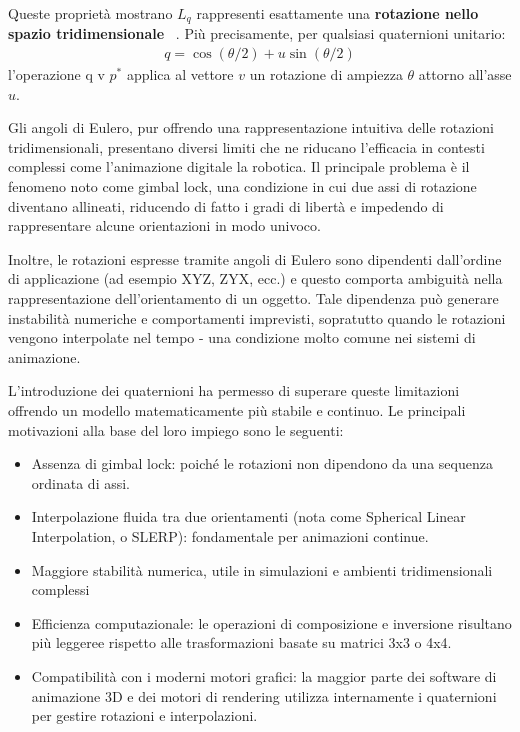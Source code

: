 \begin{itemize}
    Queste proprietà mostrano ${L_q}$ rappresenti esattamente una \textbf{rotazione nello spazio tridimensionale} ~\cite{quater3}.
    Più precisamente, per qualsiasi quaternioni unitario:
    \begin{align*}
        q = {\cos{(\theta/2)} + u\sin{(\theta/2)}}
    \end{align*}
    l'operazione q v ${p^*}$ applica al vettore ${v}$ un rotazione di ampiezza ${\theta}$ attorno all'asse ${u}$.

    Gli angoli di Eulero, pur offrendo una rappresentazione intuitiva delle rotazioni tridimensionali, presentano diversi limiti che ne riducano l'efficacia in contesti complessi come l'animazione digitale  la robotica. Il principale problema è il fenomeno noto come gimbal lock, una condizione in cui due assi di rotazione diventano allineati, riducendo di fatto i gradi di libertà e impedendo di rappresentare alcune orientazioni in modo univoco.

    Inoltre, le rotazioni espresse tramite angoli di Eulero sono dipendenti dall'ordine di applicazione (ad esempio XYZ, ZYX, ecc.) e questo comporta ambiguità nella rappresentazione dell'orientamento di un oggetto. Tale dipendenza può generare instabilità numeriche e comportamenti imprevisti, sopratutto quando le rotazioni vengono interpolate nel tempo - una condizione molto comune nei sistemi di animazione.

    L'introduzione dei quaternioni ha permesso di superare queste limitazioni offrendo un modello matematicamente più stabile e continuo. Le principali motivazioni alla base del loro impiego sono le seguenti:

    \begin{itemize}
        \item Assenza di gimbal lock: poiché le rotazioni non dipendono da una sequenza ordinata di assi.
        \item Interpolazione fluida tra due orientamenti (nota come Spherical Linear Interpolation, o SLERP): fondamentale per animazioni continue.
        \item Maggiore stabilità numerica, utile in simulazioni e ambienti tridimensionali complessi
        \item Efficienza computazionale: le operazioni di composizione e inversione risultano più leggeree rispetto alle trasformazioni basate su matrici 3x3 o 4x4.
        \item Compatibilità con i moderni motori grafici: la maggior parte dei software di animazione 3D e dei motori di rendering utilizza internamente i quaternioni per gestire rotazioni e interpolazioni.
    \end{itemize}


\end{itemize}
